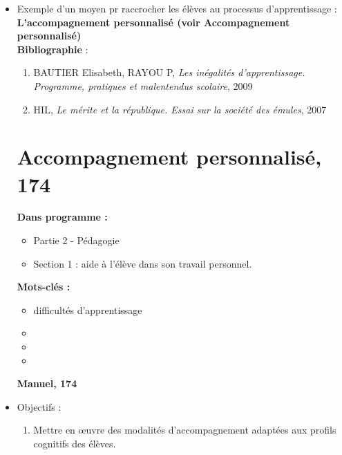 \documentclass[12pt]{report}
\begin{document}
\begin{itemize}
\begin{enumerate}
\end{enumerate}

\item Exemple d'un moyen pr raccrocher les élèves au processus d'apprentissage : \textbf{L'accompagnement personnalisé (voir Accompagnement personnalisé)} \\

\textbf{Bibliographie} : 

\begin{enumerate}
\item BAUTIER Elisabeth, RAYOU P, \textit{Les inégalités d'apprentissage. Programme, pratiques et malentendus scolaire}, 2009
\item HIL, \textit{Le mérite et la république. Essai sur la société des émules}, 2007
\end{enumerate}



\section{Accompagnement personnalisé, 174}

\textbf{Dans programme : }
\begin{itemize}
\item Partie 2 - Pédagogie
\item Section 1 : aide à l'élève dans son travail personnel. \\
\end{itemize}

\textbf{Mots-clés : } 

\begin{itemize}
\item difficultés d'apprentissage
\item 
\item 
\item  
\end{itemize}

\textbf{Manuel, 174}

\item Objectifs : 
\begin{enumerate}
\item Mettre en œuvre des modalités d'accompagnement adaptées aux profils cognitifs des élèves. \\
\end{enumerate}


\end{itemize}
\end{document}
